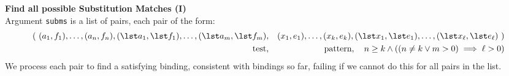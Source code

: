 \textbf{Find all possible Substitution Matches (I)}\\
  Argument \texttt{subms} is a list of pairs, each pair of the form:
  \begin{eqnarray*}
   (~(a_1,f_1),\ldots,(a_n,f_n), (\lst a_1,\lst f_1),\ldots,(\lst a_m,\lst f_m)
   &,&
     (x_1,e_1),\ldots,(x_k,e_k), (\lst x_1,\lst e_1),\ldots,(\lst x_\ell,\lst e_\ell)~)
  \\ \mbox{test}  &,& \mbox{pattern}, \quad n \geq k \land ((n \neq k \lor m > 0) \implies \ell > 0)
  \end{eqnarray*}
 We process each pair to find a satisfying binding, consistent
 with bindings so far, failing if we cannot do this for all pairs
 in the list.
